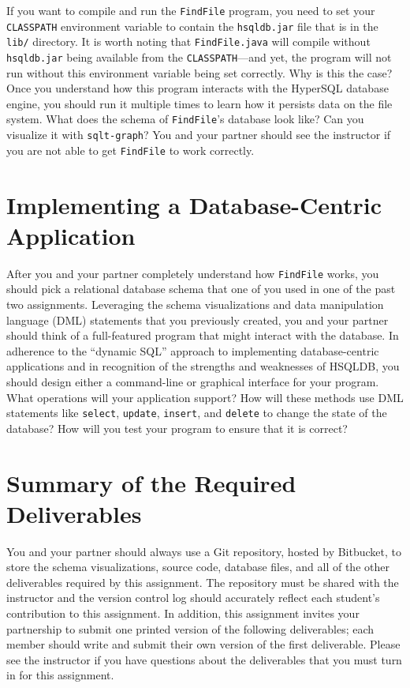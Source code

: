 If you want to compile and run the {\tt FindFile} program, you need to set your {\tt CLASSPATH} environment variable to
contain the {\tt hsqldb.jar} file that is in the {\tt lib/} directory. It is worth noting that {\tt FindFile.java} will
compile without {\tt hsqldb.jar} being available from the {\tt CLASSPATH}---and yet, the program will not run without
this environment variable being set correctly.  Why is this the case? Once you understand how this program interacts
with the HyperSQL database engine, you should run it multiple times to learn how it persists data on the file system.
What does the schema of {\tt FindFile}'s database look like? Can you visualize it with {\tt sqlt-graph}? You and your
partner should see the instructor if you are not able to get {\tt FindFile} to work correctly.

\vspace*{-.05in}
\section*{Implementing a Database-Centric Application}

After you and your partner completely understand how {\tt FindFile} works, you should pick a relational database schema
that one of you used in one of the past two assignments. Leveraging the schema visualizations and data manipulation
language (DML) statements that you previously created, you and your partner should think of a full-featured program that
might interact with the database. In adherence to the ``dynamic SQL'' approach to implementing database-centric
applications and in recognition of the strengths and weaknesses of HSQLDB, you should design either a command-line or
graphical interface for your program. What operations will your application support? How will these methods use DML
statements like {\tt select}, {\tt update}, {\tt insert}, and {\tt delete} to change the state of the database? How will
you test your program to ensure that it is correct?

\section*{Summary of the Required Deliverables}

You and your partner should always use a Git repository, hosted by Bitbucket, to store the schema visualizations, source
code, database files, and all of the other deliverables required by this assignment. The repository must be shared with
the instructor and the version control log should accurately reflect each student's contribution to this assignment. In
addition, this assignment invites your partnership to submit one printed version of the following deliverables; each
member should write and submit their own version of the first deliverable. Please see the instructor if you have
questions about the deliverables that you must turn in for this assignment.

